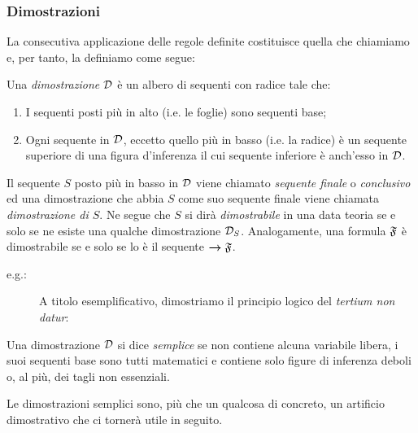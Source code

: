 	\subsubsection{Dimostrazioni}
		La consecutiva applicazione delle regole definite costituisce quella che chiamiamo  e, per tanto, la definiamo come segue:
	\begin{defin}[Dimostrazione]
		Una \emph{dimostrazione} $\mathcal{D}$ è un albero di sequenti con radice tale che:
	\begin{enumerate}
		\item I sequenti posti più in alto (i.e. le foglie) sono sequenti base;
		\item Ogni sequente in $\mathcal{D}$, eccetto quello più in basso (i.e. la radice) è un sequente superiore di una figura d'inferenza il cui sequente inferiore è anch'esso in $\mathcal{D}$.
	\end{enumerate}
	\end{defin}
		Il sequente $S$ posto più in basso in $\mathcal{D}$ viene chiamato \emph{sequente finale} o \emph{conclusivo} ed una dimostrazione che abbia $S$ come suo sequente finale viene chiamata \emph{dimostrazione di $S$}. Ne segue che $S$ si dirà \emph{dimostrabile} in una data teoria se e solo se ne esiste una qualche dimostrazione $\mathcal{D}_{S}$. Analogamente, una formula $\mathfrak{F}$ è dimostrabile se e solo se lo è il sequente $\bm{\rightarrow} \mathfrak{F}$.
	\begin{description}
		\item[e.g.:] A titolo esemplificativo, dimostriamo il principio logico del \emph{tertium non datur}:
		\begin{prooftree}
		\end{prooftree}
	\end{description}
	\begin{defin}
		Una dimostrazione $\mathcal{D}$ si dice \emph{semplice} se non contiene alcuna variabile libera, i suoi sequenti base sono tutti matematici e contiene solo figure di inferenza deboli o, al più, dei tagli non essenziali.
	\end{defin}
		Le dimostrazioni semplici sono, più che un qualcosa di concreto, un artificio dimostrativo che ci tornerà utile in seguito.

